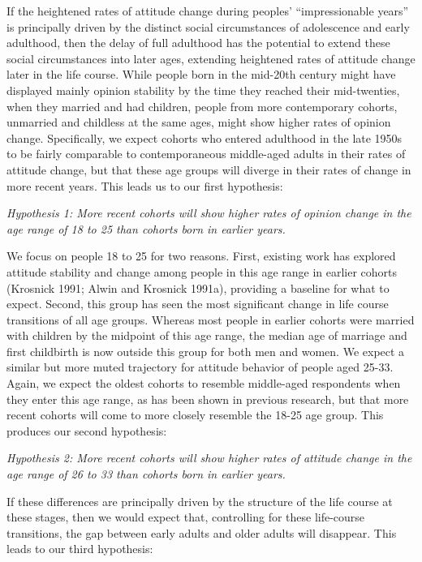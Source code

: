 \documentclass[
  12pt,
]{article}
\begin{document}
If the heightened rates of attitude change during peoples' ``impressionable years'' is principally driven by the distinct social circumstances of adolescence and early adulthood, then the delay of full adulthood has the potential to extend these social circumstances into later ages, extending heightened rates of attitude change later in the life course. While people born in the mid-20th century might have displayed mainly opinion stability by the time they reached their mid-twenties, when they married and had children, people from more contemporary cohorts, unmarried and childless at the same ages, might show higher rates of opinion change. Specifically, we expect cohorts who entered adulthood in the late 1950s to be fairly comparable to contemporaneous middle-aged adults in their rates of attitude change, but that these age groups will diverge in their rates of change in more recent years. This leads us to our first hypothesis:

\emph{Hypothesis 1: More recent cohorts will show higher rates of opinion change in the age range of 18 to 25 than cohorts born in earlier years.}

We focus on people 18 to 25 for two reasons. First, existing work has explored attitude stability and change among people in this age range in earlier cohorts (Krosnick 1991; Alwin and Krosnick 1991a), providing a baseline for what to expect. Second, this group has seen the most significant change in life course transitions of all age groups. Whereas most people in earlier cohorts were married with children by the midpoint of this age range, the median age of marriage and first childbirth is now outside this group for both men and women. We expect a similar but more muted trajectory for attitude behavior of people aged 25-33. Again, we expect the oldest cohorts to resemble middle-aged respondents when they enter this age range, as has been shown in previous research, but that more recent cohorts will come to more closely resemble the 18-25 age group. This produces our second hypothesis:

\emph{Hypothesis 2: More recent cohorts will show higher rates of attitude change in the age range of 26 to 33 than cohorts born in earlier years.}

If these differences are principally driven by the structure of the life course at these stages, then we would expect that, controlling for these life-course transitions, the gap between early adults and older adults will disappear. This leads to our third hypothesis:
\end{document}
